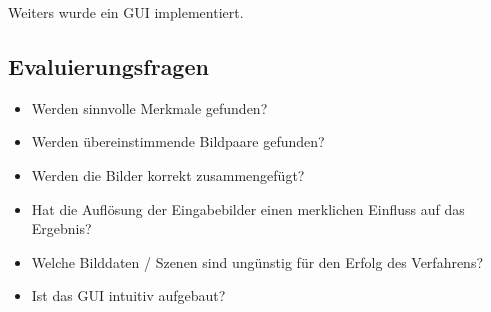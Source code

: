 \documentclass[deutsch]{scrartcl}
\begin{document}
Weiters wurde ein GUI implementiert.

\subsection{Evaluierungsfragen}
\begin{itemize}
	\item Werden sinnvolle Merkmale gefunden?
	\item Werden übereinstimmende Bildpaare gefunden?
	\item Werden die Bilder korrekt zusammengefügt?
	\item Hat die Auflösung der Eingabebilder einen merklichen Einfluss auf das Ergebnis?
	\item Welche Bilddaten / Szenen sind ungünstig für den Erfolg des Verfahrens?
	\item Ist das GUI intuitiv aufgebaut?
\end{itemize}



\newpage
\end{document}
